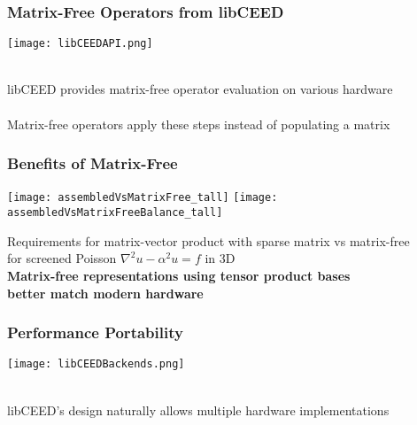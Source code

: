 \documentclass{beamer}
\begin{document}
\begin{frame}
\begin{center}
\frametitle{Matrix-Free Operators from libCEED}

\texttt{[image: libCEEDAPI.png]}

~\\

libCEED provides matrix-free operator evaluation on various hardware\\

~\\

Matrix-free operators apply these steps instead of populating a matrix\\

\end{center}
\end{frame}


\begin{frame}
\begin{center}
\frametitle{Benefits of Matrix-Free}

\texttt{[image: assembledVsMatrixFree\_tall]}
\hspace{1cm}
\texttt{[image: assembledVsMatrixFreeBalance\_tall]}

{\small Requirements for matrix-vector product with sparse matrix vs matrix-free\\ for screened Poisson $\nabla^2 u - \alpha^2 u = f$ in 3D}\\

{\bf Matrix-free representations using tensor product bases\\better match modern hardware}

\end{center}
\end{frame}


\begin{frame}
\begin{center}
\frametitle{Performance Portability}

\texttt{[image: libCEEDBackends.png]}

~\\

libCEED's design naturally allows multiple hardware implementations\\

\end{center}
\end{frame}
\end{document}
